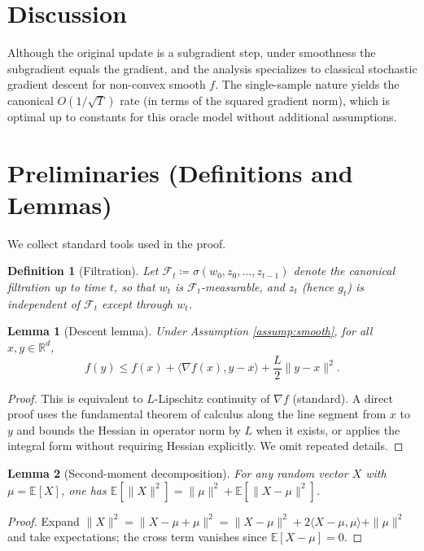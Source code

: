 \documentclass[11pt]{article}
\newtheorem{lemma}{Lemma}
\newtheorem{definition}{Definition}
\begin{document}
\section*{Discussion}
Although the original update is a subgradient step, under smoothness the subgradient equals the gradient, and the analysis specializes to classical stochastic gradient descent for non-convex smooth $f$. The single-sample nature yields the canonical $O(1/\sqrt{T})$ rate (in terms of the squared gradient norm), which is optimal up to constants for this oracle model without additional assumptions.

\section*{Preliminaries (Definitions and Lemmas)}
We collect standard tools used in the proof.

\begin{definition}[Filtration]
Let $\mathcal{F}_t \coloneqq \sigma(w_0, z_0, \dots, z_{t-1})$ denote the canonical filtration up to time $t$, so that $w_t$ is $\mathcal{F}_t$-measurable, and $z_t$ (hence $g_t$) is independent of $\mathcal{F}_t$ except through $w_t$.
\end{definition}

\begin{lemma}[Descent lemma]
\label{lem:descent}
Under Assumption \ref{assump:smooth}, for all $x,y\in\mathbb{R}^d$,
\[
f(y) \le f(x) + \langle \nabla f(x), y-x \rangle + \frac{L}{2}\|y-x\|^2.
\]
\end{lemma}
\begin{proof}
This is equivalent to $L$-Lipschitz continuity of $\nabla f$ (standard). A direct proof uses the fundamental theorem of calculus along the line segment from $x$ to $y$ and bounds the Hessian in operator norm by $L$ when it exists, or applies the integral form without requiring Hessian explicitly. We omit repeated details.
\end{proof}

\begin{lemma}[Second-moment decomposition]
\label{lem:second-moment}
For any random vector $X$ with $\mu=\mathbb{E}[X]$, one has $\mathbb{E}[\|X\|^2]=\|\mu\|^2+\mathbb{E}[\|X-\mu\|^2]$.
\end{lemma}
\begin{proof}
Expand $\|X\|^2 = \|X-\mu+\mu\|^2 = \|X-\mu\|^2 + 2\langle X-\mu,\mu\rangle + \|\mu\|^2$ and take expectations; the cross term vanishes since $\mathbb{E}[X-\mu]=0$.
\end{proof}
\end{document}
